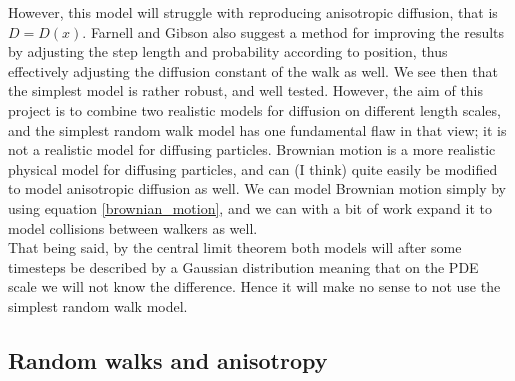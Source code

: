 However, this model will struggle with reproducing anisotropic diffusion, that is $D = D(x)$. Farnell and Gibson also suggest a method for improving the results by adjusting the step length and probability according to position, thus effectively adjusting the diffusion constant of the walk as well. 
We see then that the simplest model is rather robust, and well tested. 
However, the aim of this project is to combine two realistic models for diffusion on different length scales, and the simplest random walk model has one fundamental flaw in that view; it is not a realistic model for diffusing particles. 
Brownian motion is a more realistic physical model for diffusing particles, and can (I think) quite easily be modified to model anisotropic diffusion as well. 
We can model Brownian motion simply by using equation \ref{brownian_motion}, and we can with a bit of work expand it to model collisions between walkers as well. \\
That being said, by the central limit theorem both models will after some timesteps be described by a Gaussian distribution meaning that on the PDE scale we will not know the difference. 
Hence it will make no sense to not use the simplest random walk model.


\subsection{Random walks and anisotropy}\label{random_walks_and_anisotropy}

